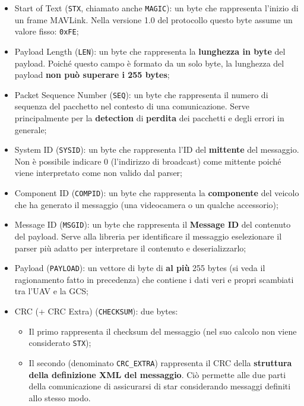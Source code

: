 \documentclass[a4paper, 12pt, oneside]{article}
\begin{document}
\begin{itemize}
    \item Start of Text (\texttt{STX}, chiamato anche \texttt{MAGIC}): un byte che rappresenta l'inizio di un frame MAVLink. Nella versione 1.0 del protocollo questo byte assume un valore fisso: \texttt{0xFE};
    \item Payload Length (\texttt{LEN}): un byte che rappresenta la \textbf{lunghezza in byte} del payload. Poiché questo campo è formato da un solo byte, la lunghezza del payload \textbf{non può superare i 255 bytes};
    \item Packet Sequence Number (\texttt{SEQ}): un byte che rappresenta il numero di sequenza del pacchetto nel contesto di una comunicazione. Serve principalmente per la \textbf{detection} di \textbf{perdita} dei pacchetti e degli errori in generale;
    \item System ID (\texttt{SYSID}): un byte che rappresenta l'ID del \textbf{mittente} del messaggio. Non è possibile indicare 0 (l'indirizzo di broadcast) come mittente poiché viene interpretato come non valido dal parser;
    \item Component ID (\texttt{COMPID}): un byte che rappresenta la \textbf{componente} del veicolo che ha generato il messaggio (una videocamera o un qualche accessorio);
    \item Message ID (\texttt{MSGID}): un byte che rappresenta il \textbf{Message ID} del contenuto del payload. Serve alla libreria per identificare il messaggio eselezionare il parser più adatto per interpretare il contenuto e deserializzarlo;
    \item Payload (\texttt{PAYLOAD}): un vettore di byte di \textbf{al più} 255 bytes (si veda il ragionamento fatto in precedenza) che contiene i dati veri e propri scambiati tra l'UAV e la GCS;
    \item CRC (+ CRC Extra) (\texttt{CHECKSUM}): due bytes: \begin{itemize}
        \item Il primo rappresenta il checksum del messaggio (nel suo calcolo non viene considerato \texttt{STX});
        \item Il secondo (denominato \texttt{CRC\_EXTRA}) rappresenta il CRC della \textbf{struttura della definizione XML del messaggio}. Ciò permette alle due parti della comunicazione di assicurarsi di star considerando messaggi definiti allo stesso modo.
    \end{itemize}
\end{itemize}
\end{document}
